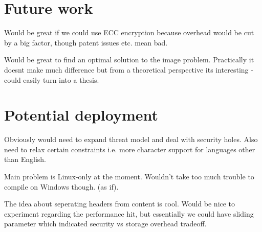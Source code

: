 \section{Future work}

Would be great if we could use ECC encryption because overhead would be cut by a big factor, though patent issues etc. mean bad.

Would be great to find an optimal solution to the image problem. Practically it doesnt make much difference but from a theoretical perspective its interesting - could easily turn into a thesis.


\section{Potential deployment}

Obviously would need to expand threat model and deal with security holes. Also need to relax certain constraints i.e. more character support for languages other than English.

Main problem is Linux-only at the moment. Wouldn't take too much trouble to compile on Windows though. (as if).

The idea about seperating headers from content is cool. Would be nice to experiment regarding the performance hit, but essentially we could have sliding parameter which indicated security vs storage overhead tradeoff.


